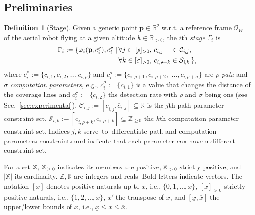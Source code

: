\documentclass[letterpaper,10pt,conference,twoside]{IEEEtran}
\theoremstyle{definition}
\newtheorem{defn}{Definition}[section]
\begin{document}
\subsection{Preliminaries}
\label{sec:prelim}


\begin{defn}[Stage]\label{def:stage}
  Given a generic point $\mathbf{p}\in\mathbb{R}^2$ w.r.t. a reference frame $\mathcal{O}_W$ of the aerial robot flying at a given altitude $h\in\mathbb{R}_{>0}$, the $i$th \emph{stage} $\Gamma_i$ %
  is
  \begin{equation*}\begin{split}
    \Gamma_i:=\{{\color{black}\varphi_i(\mathbf{p}%
    ,c_i^\rho)},c_i^\sigma\mid
    \,&\forall j\in\,[\rho]_{>0},\,c_{i,j}\,\,\,\,\,\,\,\in\mathcal{C}_{i,j},\,\\
      &\forall k\in[\sigma]_{>0},\,c_{i,\rho+k}\in\mathcal{S}_{i,k}\,\},
  \end{split}\end{equation*}
  where $c_i^\rho${\color{black}$:=\{c_{i,1},c_{i,2},\dots,c_{i,\rho}\}$} and $c_i^\sigma${\color{black}$:=\{c_{i,\rho+1},c_{i,\rho+2},$ $\dots,c_{i,\rho+\sigma}\}$} are $\rho$ \emph{path} and $\sigma$ \emph{computation parameters}{\color{black}, e.g., $c_i^\rho:=\{c_{i,1}\}$ is a value that changes the distance of the coverage lines and $c^\sigma_i:=\{c_{i,2}\}$ the detection rate with $\rho$ and $\sigma$ being one (see Sec.~\ref{sec:experimental})}. $\mathcal{C}_{i,j}:=[\underline{c}_{i,j},\overline{c}_{i,j}]\subseteq\mathbb{R}$ is the $j$th path parameter %
  constraint set, %
  $\mathcal{S}_{i,k}:=[\underline{c}_{i,\rho+k},\overline{c}_{i,\rho+k}]\subseteq\mathbb{Z}_{\geq 0}$ %
  the $k$th computation parameter constraint set. {\color{black}Indices $j,k$ serve~to~differentiate path and computation parameters constraints and indicate that each parameter can have a different constraint set.} 
\end{defn}


For a set $\mathbb{X}$, $\mathbb{X}_{\geq 0}$ indicates its members are positive, $\mathbb{X}_{> 0}$ strictly positive, and $|\mathbb{X}|$ its cardinality. $\mathbb{Z},\mathbb{R}$ are %
integers and reals. %
Bold letters indicate vectors. 
The notation $[x]$ denotes positive naturals up to $x$, i.e., $\{0,1,\dots,x\}$, {\color{black}$[x]_{>0}$ strictly positive naturals, i.e., $\{1,2,\dots,x\}$,} $x'$ the transpose of $x$, and $[\underline{x},\overline{x}]$ the upper/lower bounds of %
$x$, i.e.,
  $\underline{x}\leq x\leq\overline{x}$.
\end{document}
